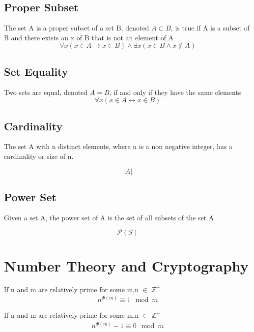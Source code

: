 \documentclass[12pt]{article}
\begin{document}
\subsection{Proper Subset}
The set A is a proper subset of a set B, denoted $A \subset B$,
is true 
if A is a subset of B 
and 
there exists an x of B that is not an element of A
\begin{equation}
\forall x (x \in A \rightarrow x \in B) \wedge \exists x (x \in B \wedge x \not \in A)
\end{equation}

\subsection{Set Equality}
Two sets are equal, denoted $A = B$,
if and only if
they have the same elements
\begin{equation}
\forall x(x \in A \leftrightarrow x \in B)
\end{equation}

\subsection{Cardinality}
The set A with n distinct elements, where n is a non negative integer,
has a cardinality or size of n.

\begin{equation}
\left| {A} \right|
\end{equation}

\subsection{Power Set}
Given a set A, the power set of A is the set of all subsets of the set A 

\begin{equation}
\mathcal P \left({S}\right)
\end{equation}

%
%
%
%
%
%
\pagebreak
\section{Number Theory and Cryptography}
\setcounter{equation}{0}
If 
n
and
m
are
relatively
prime 
for
some
m,n $\in$ $\mathbb{Z}^+$
\begin{align}
n^{\Phi(m)}\equiv 1\mod{m}
\end{align}


If 
n
and
m
are
relatively
prime 
for
some
m,n $\in$ $\mathbb{Z}^+$
\begin{align}
n^{\Phi(m)} - 1\equiv 0\mod{m}
\end{align}
\end{document}
